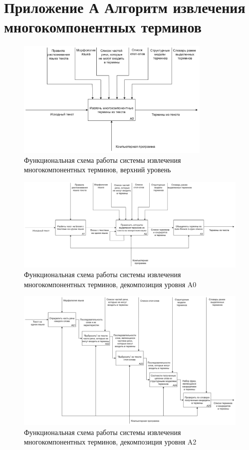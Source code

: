 \section*{Приложение А Алгоритм извлечения многокомпонентных терминов}

\begin{figure}
	\centering
	\includegraphics[width=0.83\textwidth ]{img/IDEF0/A0.png}
	\caption{Функциональная схема работы системы извлечения многокомпонентных терминов, верхний уровень}
\end{figure} 

\begin{figure}
	\centering
	\includegraphics[width=\textwidth ]{img/IDEF0/A0_decomposition.png}
	\caption{Функциональная схема работы системы извлечения многокомпонентных терминов, декомпозиция уровня A0}
\end{figure} 

\begin{figure}
	\centering
	\includegraphics[width=\textwidth ]{img/IDEF0/A2_decomposition.png}
	\caption{Функциональная схема работы системы извлечения многокомпонентных терминов, декомпозиция уровня A2}
\end{figure} 

\pagebreak